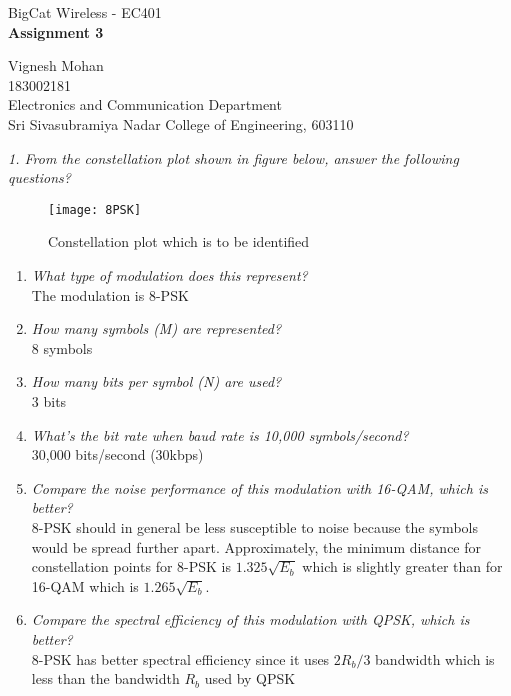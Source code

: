 \documentclass[a4paper]{article}
\begin{document}

\Large
 \begin{center}
BigCat Wireless - EC401\\
\textbf{Assignment 3}

\hspace{10pt}

\large
Vignesh Mohan\\
\smallskip
\small
183002181\\
\small
Electronics and Communication Department\\
\small
Sri Sivasubramiya Nadar College of Engineering, 603110\\
\end{center}

\hspace{10pt}
\normalsize

\textit{1. From the constellation plot shown in figure below, answer the following questions?}\\
\bigskip
\begin{figure}[hbt!]
  \centering
  \texttt{[image: 8PSK]}
  \caption{Constellation plot which is to be identified}
\end{figure}
\begin{enumerate}
  \item \textit{What type of modulation does this represent?}\\
  The modulation is 8-PSK\\
  \item \textit{How many symbols (M) are represented?}\\
  8 symbols
  \item \textit{How many bits per symbol (N) are used?}\\
  3 bits
  \item \textit{What’s the bit rate when baud rate is 10,000 symbols/second?}\\
  30,000 bits/second (30kbps)
  \item \textit{Compare the noise performance of this modulation with 16-QAM, which is better?}\\
  8-PSK should in general be less susceptible to noise because the symbols would be spread further apart. Approximately, the minimum distance for constellation points for 8-PSK is  $1.325\sqrt{E_b}$ which is slightly greater than for 16-QAM which is $1.265\sqrt{E_b}$.
  \item \textit{Compare the spectral efficiency of this modulation with QPSK, which is better?}\\
  8-PSK has better spectral efficiency since it uses $2R_b/3$ bandwidth which is less than the bandwidth $R_b$ used by QPSK
\end{enumerate}
\end{document}
